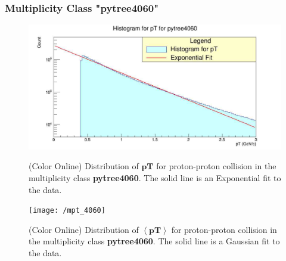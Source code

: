 \documentclass[letterpaper,aps,prc,superscriptaddress,nofootinbib,10pt,showpacs,floatfix]{revtex4-2}%
\begin{document}
\subsubsection{Multiplicity Class "pytree4060"}
\label{subsubsec:4060}
\vspace{-5mm}
\begin{figure}[!htb]
   \begin{minipage}{0.48\textwidth}
   \label{Fig:2a}
   \label{Fig:2b}
     \centering
     \renewcommand{\thefigure}{2a}
     \includegraphics[width=1.1\linewidth]{pt_4060}
     \caption{(Color Online) Distribution of $\mathbf{pT}$ for proton-proton collision in the multiplicity class \textbf{pytree4060}. The solid line is an Exponential fit to the data.}
   \end{minipage}\hfill
   \begin{minipage}{0.48\textwidth}
     \centering
     \renewcommand{\thefigure}{2b}
     \texttt{[image: /mpt\_4060]}
     \caption{(Color Online) Distribution of $\mathbf{\left<pT\right>}$ for proton-proton collision in the multiplicity class \textbf{pytree4060}. The solid line is a Gaussian fit to the data.}
   \end{minipage}
\end{figure}

\FloatBarrier
\vspace{-3mm}
\end{document}
